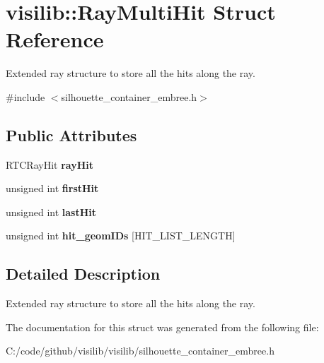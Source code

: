 \hypertarget{structvisilib_1_1_ray_multi_hit}{}\section{visilib\+::Ray\+Multi\+Hit Struct Reference}
\label{structvisilib_1_1_ray_multi_hit}


Extended ray structure to store all the hits along the ray. 




{\ttfamily \#include $<$silhouette\+\_\+container\+\_\+embree.\+h$>$}

\subsection*{Public Attributes}
\begin{DoxyCompactItemize}
\item 
\mbox{\label{structvisilib_1_1_ray_multi_hit_a3f8a378c9a5b213d64f0616262322dad}} 
R\+T\+C\+Ray\+Hit {\bfseries ray\+Hit}
\item 
\mbox{\label{structvisilib_1_1_ray_multi_hit_a6a0dcd46cec9bc639a43b2151b05105a}} 
unsigned int {\bfseries first\+Hit}
\item 
\mbox{\label{structvisilib_1_1_ray_multi_hit_a03e1f83d769c1405441cc31afc7d67fc}} 
unsigned int {\bfseries last\+Hit}
\item 
\mbox{\label{structvisilib_1_1_ray_multi_hit_abd9e86ea3f60605b165a9ff24ceb2e35}} 
unsigned int {\bfseries hit\+\_\+geom\+I\+Ds} \mbox{[}H\+I\+T\+\_\+\+L\+I\+S\+T\+\_\+\+L\+E\+N\+G\+TH\mbox{]}
\end{DoxyCompactItemize}


\subsection{Detailed Description}
Extended ray structure to store all the hits along the ray. 

The documentation for this struct was generated from the following file\+:\begin{DoxyCompactItemize}
\item 
C\+:/code/github/visilib/visilib/silhouette\+\_\+container\+\_\+embree.\+h\end{DoxyCompactItemize}
